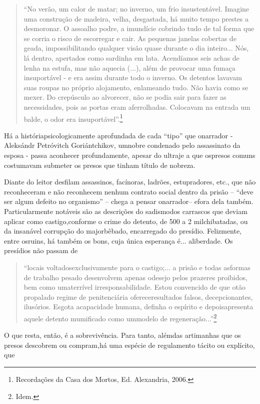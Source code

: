 \begin{quote}
``No verão, um calor de matar; no inverno, um frio insustentável.
Imagine uma construção de madeira, velha, desgastada, há muito tempo
prestes a desmoronar. O assoalho podre, a imundície cobrindo tudo de tal
forma que se corria o risco de escorregar e cair. As pequenas janelas
cobertas de geada, impossibilitando qualquer visão quase durante o dia
inteiro... Nós, lá dentro, apertados como sardinha em lata. Acendíamos
seis achas de lenha na estufa, mas não aquecia (...), além de provocar
uma fumaça insuportável - e era assim durante todo o inverno. Os
detentos lavavam suas roupas no próprio alojamento, enlameando tudo. Não
havia como se mexer. Do crepúsculo ao alvorecer, não se podia sair para
fazer as necessidades, pois as portas eram aferrolhadas. Colocavam na
entrada um balde, o odor era insuportável''.\footnote{Recordações da
  Casa dos Mortos, Ed. Alexandria, 2006.}
\end{quote}

Há a históriapsicologicamente aprofundada de cada ``tipo'' que onarrador
- Aleksándr Petróvitch Goriántchikov, umnobre condenado pelo assassinato
da esposa - passa aconhecer profundamente, apesar do ultraje a que
ospresos comuns costumavam submeter os presos que tinham título de
nobreza.

Diante do leitor desfilam assassinos, facínoras, ladrões, estupradores,
etc., que não reconheceram e não reconhecem nenhum contrato social
dentro da prisão -- ``deve ser algum defeito no organismo'' -- chega a
pensar onarrador-- efora dela também. Particularmente notáveis são as
descrições do sadismodos carrascos que deviam aplicar como
castigo,conforme o crime do detento, de 500 a 2 milchibatadas, ou da
insanável corrupção do majorbêbado, encarregado do presídio. Felizmente,
entre osruins, há também os bons, cuja única esperança é... aliberdade.
Os presídios não passam de

\begin{quote}
``locais voltadosexclusivamente para o castigo;... a prisão e todas
asformas de trabalho pesado desenvolvem apenas odesejo pelos prazeres
proibidos, bem como umaterrível irresponsabilidade. Estou convencido de
que otão propalado regime de penitenciária ofereceresultados falsos,
decepcionantes, ilusórios. Esgota acapacidade humana, definha o espírito
e depoisapresenta aquele detento mumificado como ummodelo de
regeneração...''\footnote{Idem.}
\end{quote}

O que resta, então, é a sobrevivência. Para tanto, alémdas artimanhas
que os presos descobrem ou compram,há uma espécie de regulamento tácito
ou explícito, que

